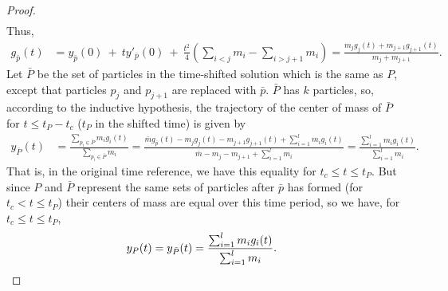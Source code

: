 \documentclass[11pt]{article}
\numberwithin{equation}{section}
\begin{document}
\begin{proof}
\begin{align*}
            \end{align*}
            Thus,
            \begin{align*}
                g_{\bar{p}}(t) 
                &= y_{\bar{p}}(0)\ +\ ty'_{\bar{p}}(0)\ +\ \frac{t^2}{4} \left(\sum_{i<j}m_i-\sum_{i>j+1}m_i \right)  
                =\frac{m_jg_j(t) + m_{j+1}g_{j+1}(t)}{m_j + m_{j+1}}. 
            \end{align*}
            Let $\bar P$ be the set of particles in the time-shifted solution which is the same as $P$, except that particles $p_j$ and $p_{j+1}$ are replaced with $\bar p$. $\bar P$ has $k$ particles, so, according to the inductive hypothesis, the trajectory of the center of mass of $\bar P$ for $t \le t_P-t_c$ ($t_P$ in the shifted time) is given by
            \begin{align}
                y_{\bar P}(t) &= \frac{\sum_{p_i \in \bar{P}}m_ig_i(t)}{\sum_{p_i \in \bar{P}}m_i}\nonumber 
                = \frac{\bar m g_{\bar p}(t) - m_jg_j(t) - m_{j+1}g_{j+1}(t) + \sum_{i=1}^{l}m_ig_i(t)}{\bar m - m_j - m_{j+1} + \sum_{i=1}^{l}m_i}\nonumber 
                = \frac{\sum_{i=1}^{l}m_ig_i(t)}{\sum_{i=1}^{l}m_i}\nonumber.
            \end{align}
            That is, in the original time reference, we have this equality for $t_c \le t\le t_P$. But since $P$ and $\bar P$ represent the same sets of particles after $\bar p$ has formed (for $t_c<t\le t_P$) their centers of mass are equal over this time period, so we have, for $t_c \le t \le t_P$, 
            \begin{align*}
                y_{P}(t) &= y_{\bar P}(t) = \frac{\sum_{i=1}^{l}m_ig_i(t)}{\sum_{i=1}^{l}m_i}. \qedhere
            \end{align*}
        \end{proof}
\end{document}
